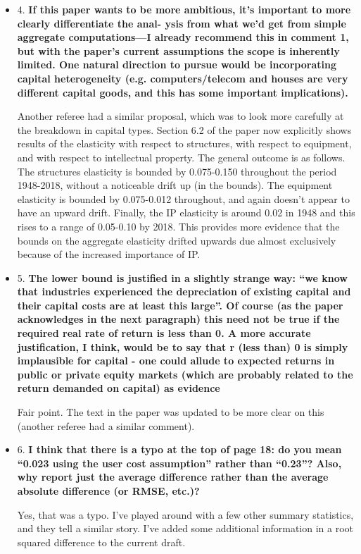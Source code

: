 \documentclass[11pt]{article}
\begin{document}
\begin{itemize}
	\item 4. \textbf{If this paper wants to be more ambitious, it’s important to more clearly differentiate the anal- ysis from what we’d get from simple aggregate computations—I already recommend this in comment 1, but with the paper’s current assumptions the scope is inherently limited. One natural direction to pursue would be incorporating capital heterogeneity (e.g. computers/telecom and houses are very different capital goods, and this has some important implications).}

	Another referee had a similar proposal, which was to look more carefully at the breakdown in capital types. Section 6.2 of the paper now explicitly shows results of the elasticity with respect to structures, with respect to equipment, and with respect to intellectual property. The general outcome is as follows. The structures elasticity is bounded by 0.075-0.150 throughout the period 1948-2018, without a noticeable drift up (in the bounds). The equipment elasticity is bounded by 0.075-0.012 throughout, and again doesn't appear to have an upward drift. Finally, the IP elasticity is around 0.02 in 1948 and this rises to a range of 0.05-0.10 by 2018. This provides more evidence that the bounds on the aggregate elasticity drifted upwards due almost exclusively because of the increased importance of IP. 

	\item 5. \textbf{The lower bound is justified in a slightly strange way: “we know that industries experienced the depreciation of existing capital and their capital costs are at least this large”. Of course (as the paper acknowledges in the next paragraph) this need not be true if the required real rate of return is less than 0. A more accurate justification, I think, would be to say that r (less than) 0 is simply implausible for capital - one could allude to expected returns in public or private equity markets (which are probably related to the return demanded on capital) as evidence}

	Fair point. The text in the paper was updated to be more clear on this (another referee had a similar comment). 

	\item 6. \textbf{I think that there is a typo at the top of page 18: do you mean “0.023 using the user cost assumption” rather than “0.23”? Also, why report just the average difference rather than the average absolute difference (or RMSE, etc.)?}

	Yes, that was a typo. I've played around with a few other summary statistics, and they tell a similar story. I've added some additional information in a root squared difference to the current draft.

\end{itemize}
\end{document}

